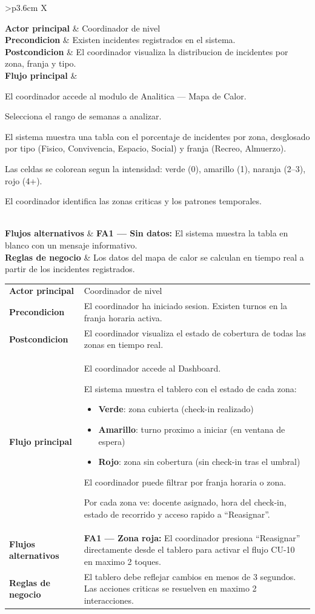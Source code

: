 \documentclass[12pt, a4paper]{article}
\newcommand{\cu}[3]{%
  \begin{tcolorbox}[casousostyle, title={#1},
    after title={\hfill\small\normalfont\color{white!80!azulOscuro}#2}]
  \renewcommand{\arraystretch}{1.35}
  \begin{tabularx}{\linewidth}{>{\bfseries\color{azulOscuro}\small}p{3.6cm} X}
  #3
  \end{tabularx}
  \end{tcolorbox}
  \vspace{6pt}
}
\newcommand{\fcu}[2]{\small\textbf{\color{azulOscuro}#1} & \small #2 \\}
\begin{document}
\cu{CU-12 --- Consultar mapa de calor de incidentes}{Coordinador / Admin}{
  \fcu{Actor principal}{Coordinador de nivel}
  \fcu{Precondicion}{Existen incidentes registrados en el sistema.}
  \fcu{Postcondicion}{El coordinador visualiza la distribucion de incidentes por zona, franja y tipo.}
  \fcu{Flujo principal}{
    \begin{pasos}
      \item El coordinador accede al modulo de Analitica --- Mapa de Calor.
      \item Selecciona el rango de semanas a analizar.
      \item El sistema muestra una tabla con el porcentaje de incidentes por zona, desglosado por tipo (Fisico, Convivencia, Espacio, Social) y franja (Recreo, Almuerzo).
      \item Las celdas se colorean segun la intensidad: verde (0), amarillo (1), naranja (2--3), rojo (4+).
      \item El coordinador identifica las zonas criticas y los patrones temporales.
    \end{pasos}
  }
  \fcu{Flujos alternativos}{
    \textbf{FA1 --- Sin datos:} El sistema muestra la tabla en blanco con un mensaje informativo.
  }
  \fcu{Reglas de negocio}{Los datos del mapa de calor se calculan en tiempo real a partir de los incidentes registrados.}
}

\cu{CU-13 --- Consultar tablero en vivo}{Coordinador}{
  \fcu{Actor principal}{Coordinador de nivel}
  \fcu{Precondicion}{El coordinador ha iniciado sesion. Existen turnos en la franja horaria activa.}
  \fcu{Postcondicion}{El coordinador visualiza el estado de cobertura de todas las zonas en tiempo real.}
  \fcu{Flujo principal}{
    \begin{pasos}
      \item El coordinador accede al Dashboard.
      \item El sistema muestra el tablero con el estado de cada zona:
        \begin{itemize}[itemsep=1pt, topsep=2pt]
          \item \textbf{Verde}: zona cubierta (check-in realizado)
          \item \textbf{Amarillo}: turno proximo a iniciar (en ventana de espera)
          \item \textbf{Rojo}: zona sin cobertura (sin check-in tras el umbral)
        \end{itemize}
      \item El coordinador puede filtrar por franja horaria o zona.
      \item Por cada zona ve: docente asignado, hora del check-in, estado de recorrido y acceso rapido a ``Reasignar''.
    \end{pasos}
  }
  \fcu{Flujos alternativos}{
    \textbf{FA1 --- Zona roja:} El coordinador presiona ``Reasignar'' directamente desde el tablero para activar el flujo CU-10 en maximo 2 toques.
  }
  \fcu{Reglas de negocio}{El tablero debe reflejar cambios en menos de 3 segundos. Las acciones criticas se resuelven en maximo 2 interacciones.}
}
\end{document}
